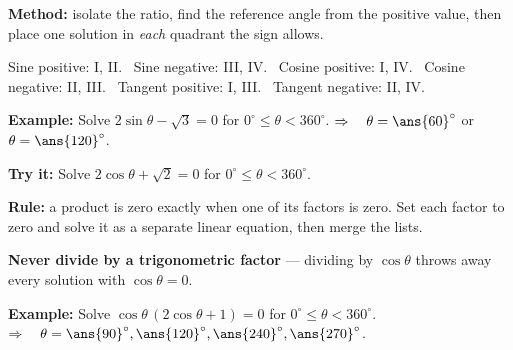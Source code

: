 \documentclass[12pt]{article}
\begin{document}


\begin{formulabox}
\textbf{Method:} isolate the ratio, find the reference angle from the positive value, then place one solution in \emph{each} quadrant the sign allows.\par
Sine positive: I, II. \ Sine negative: III, IV. \ Cosine positive: I, IV. \ Cosine negative: II, III. \ Tangent positive: I, III. \ Tangent negative: II, IV.
\end{formulabox}

\begin{examplebox}
\textbf{Example:} \quad Solve $2\sin\theta - \sqrt{3} = 0$ for $0^\circ \le \theta < 360^\circ$.
$\Rightarrow\quad \theta = \ans{60}^\circ$ or $\theta = \ans{120}^\circ$.
\end{examplebox}

\begin{tryitbox}
\textbf{Try it:} \quad Solve $2\cos\theta + \sqrt{2} = 0$ for $0^\circ \le \theta < 360^\circ$.\\[2pt]
\end{tryitbox}


\begin{formulabox}
\textbf{Rule:} a product is zero exactly when one of its factors is zero. Set each factor to zero and solve it as a separate linear equation, then merge the lists.\par
\textbf{Never divide by a trigonometric factor} --- dividing by $\cos\theta$ throws away every solution with $\cos\theta = 0$.
\end{formulabox}

\begin{examplebox}
\textbf{Example:} \quad Solve $\cos\theta\,(2\cos\theta + 1) = 0$ for $0^\circ \le \theta < 360^\circ$.
$\Rightarrow\quad \theta = \ans{90}^\circ, \ans{120}^\circ, \ans{240}^\circ, \ans{270}^\circ$.
\end{examplebox}
\end{document}
